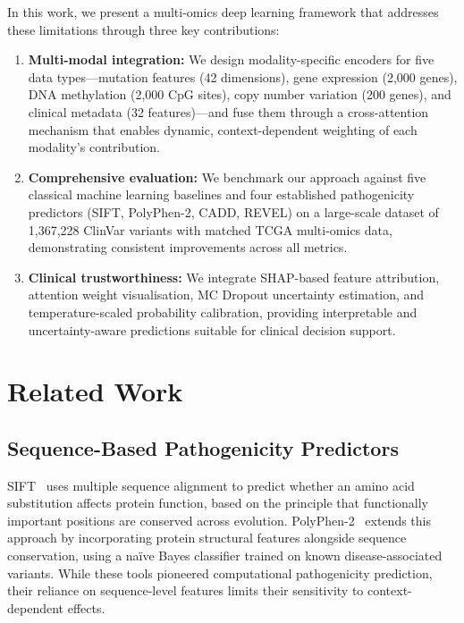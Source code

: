 \documentclass[journal,twoside]{IEEEtran}
\begin{document}
In this work, we present a multi-omics deep learning framework that addresses
these limitations through three key contributions:

\begin{enumerate}
    \item \textbf{Multi-modal integration:} We design modality-specific
    encoders for five data types---mutation features (42 dimensions), gene
    expression (2,000 genes), DNA methylation (2,000 CpG sites), copy number
    variation (200 genes), and clinical metadata (32 features)---and fuse
    them through a cross-attention mechanism that enables dynamic,
    context-dependent weighting of each modality's contribution.

    \item \textbf{Comprehensive evaluation:} We benchmark our approach against
    five classical machine learning baselines and four established
    pathogenicity predictors (SIFT, PolyPhen-2, CADD, REVEL) on a large-scale
    dataset of 1,367,228 ClinVar variants with matched TCGA multi-omics data,
    demonstrating consistent improvements across all metrics.

    \item \textbf{Clinical trustworthiness:} We integrate SHAP-based feature
    attribution, attention weight visualisation, MC Dropout uncertainty
    estimation, and temperature-scaled probability calibration, providing
    interpretable and uncertainty-aware predictions suitable for clinical
    decision support.
\end{enumerate}

\section{Related Work}

\subsection{Sequence-Based Pathogenicity Predictors}

SIFT~\cite{kumar2009sift} uses multiple sequence alignment to predict whether
an amino acid substitution affects protein function, based on the principle
that functionally important positions are conserved across evolution.
PolyPhen-2~\cite{adzhubei2010polyphen2} extends this approach by incorporating
protein structural features alongside sequence conservation, using a na\"ive
Bayes classifier trained on known disease-associated variants. While these
tools pioneered computational pathogenicity prediction, their reliance on
sequence-level features limits their sensitivity to context-dependent effects.
\end{document}
